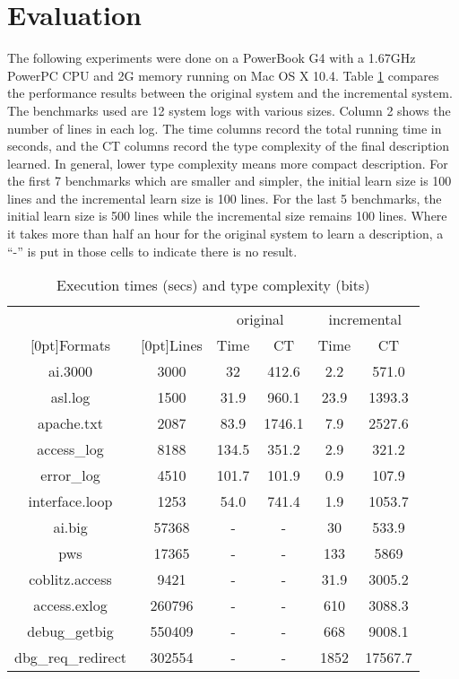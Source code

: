 \section{Evaluation}
\label{sec:eval}
The following experiments were done on a PowerBook G4 with a 1.67GHz PowerPC
CPU and 2G memory running on Mac OS X 10.4. 
Table \ref{tab:results} compares the performance results between
the original \learnpads{} system and the incremental system. 
The benchmarks used are 12 system logs with various sizes. Column 2
shows the number of lines in each log. The time columns record the total
running time in seconds, and the CT columns record the type complexity
of the final description learned. In general, lower type complexity means
more compact description. For the first 7 benchmarks which are smaller
and simpler, the initial learn size is 100 lines and the 
incremental learn size is 100 lines. For the last 5 benchmarks, 
the initial learn size is 500 lines while the incremental size remains
100 lines. Where it takes more than half an hour for the original \learnpads{}
system to learn a description, a ``-'' is put in those cells to 
indicate there is no result.

\begin{table}[th]
\begin{tabular}{|c|c|c|c|c|c|}\hline
& & \multicolumn{2}{|c|}{original} & \multicolumn{2}{|c|}{incremental} \\ \cline{3-6}
\raisebox{1.5ex}[0pt]{Formats} & \raisebox{1.5ex}[0pt]{Lines} &
	Time & CT & Time & CT \\ \hline \hline
ai.3000	&	3000	& 32	& 412.6	& 2.2	& 571.0	\\ \hline
asl.log  &	1500	& 31.9	& 960.1	& 23.9 	& 1393.3 \\ \hline
apache.txt  &	2087	& 83.9 & 1746.1 & 7.9 	& 2527.6 \\ \hline
access\_log  &	8188 	& 134.5	& 351.2	& 2.9	& 321.2	\\ \hline
error\_log  &	4510	& 101.7	& 101.9	& 0.9	& 107.9 \\ \hline
interface.loop & 1253	& 54.0	& 741.4	& 1.9	& 1053.7 \\ \hline
ai.big	&	57368	& -	& -	& 30	& 533.9 \\ \hline
pws	&	 17365	& -	& - 	& 133  & 5869 \\ \hline
coblitz.access & 9421   & -	& -	& 31.9 & 3005.2 \\ \hline
access.exlog & 260796 	& -	& -	& 610 & 3088.3 \\ \hline
debug\_getbig & 550409   & -	& -	& 668 & 9008.1 \\ \hline
dbg\_req\_redirect & 302554 & -	& -	& 1852 & 17567.7 \\ \hline
\end{tabular}
\caption{Execution times (secs) and type complexity (bits)} 
\label{tab:results}
\end{table}


